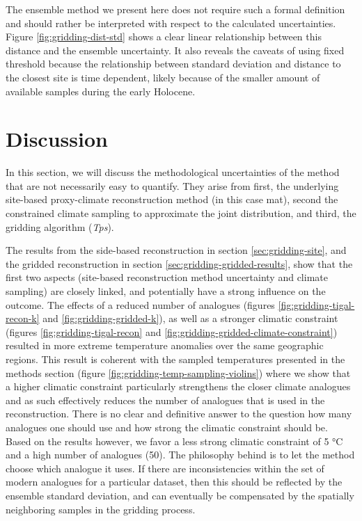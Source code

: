\begin{refsection}
The ensemble method we present here does not require such a formal definition and should rather be interpreted with respect to the calculated uncertainties. Figure \ref{fig:gridding-dist-std} shows a clear linear relationship between this distance and the ensemble uncertainty. It also reveals the caveats of using fixed threshold because the relationship between standard deviation and distance to the closest site is time dependent, likely because of the smaller amount of available samples during the early Holocene.

\section{Discussion}  \label{sec:gridding-discussion}
In this section, we will discuss the methodological uncertainties of the method that are not necessarily easy to quantify. They arise from first, the underlying site-based proxy-climate reconstruction method (in this case \gls{mat}), second the constrained climate sampling to approximate the joint distribution, and third, the gridding algorithm (\textit{Tps}).

The results from the side-based reconstruction in section \ref{sec:gridding-site}, and the gridded reconstruction in section \ref{sec:gridding-gridded-results}, show that the first two aspects (site-based reconstruction method uncertainty and climate sampling) are closely linked, and potentially have a strong influence on the outcome. The effects of a reduced number of analogues (figures \ref{fig:gridding-tigal-recon-k} and \ref{fig:gridding-gridded-k}), as well as a stronger climatic constraint (figures \ref{fig:gridding-tigal-recon} and \ref{fig:gridding-gridded-climate-constraint}) resulted in more extreme temperature anomalies over the same geographic regions. This result is coherent with the sampled temperatures presented in the methods section (figure \ref{fig:gridding-temp-sampling-violins}) where we show that a higher climatic constraint particularly strengthens the closer climate analogues and as such effectively reduces the number of  analogues that is used in the reconstruction. There is no clear and definitive answer to the question how many analogues one should use and how strong the climatic constraint should be. Based on the results however, we favor a less strong climatic constraint of 5 °C and a high number of analogues (50). The philosophy behind is to let the method choose which analogue it uses. If there are inconsistencies within the set of modern analogues for a particular dataset, then this should be reflected by the ensemble standard deviation, and can eventually be compensated by the spatially neighboring samples in the gridding process.


\end{refsection}
